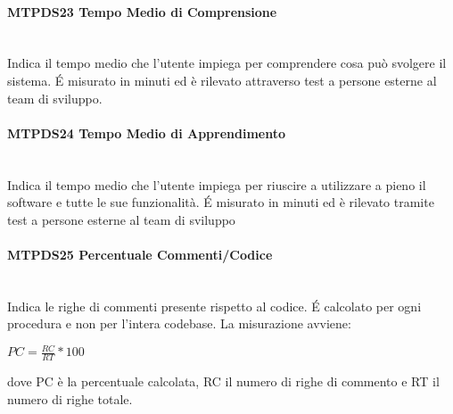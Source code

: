 \paragraph{MTPDS23 Tempo Medio di Comprensione}\-\\
Indica il tempo medio che l'utente impiega per comprendere cosa può svolgere il sistema. \'E misurato in minuti ed è rilevato attraverso test a persone esterne al team di sviluppo.

\paragraph{MTPDS24 Tempo Medio di Apprendimento}\-\\
Indica il tempo medio che l'utente impiega per riuscire a utilizzare a pieno il software e tutte le sue funzionalità. \'E misurato in minuti ed è rilevato tramite test a persone esterne al team di sviluppo 

\paragraph{MTPDS25 Percentuale Commenti/Codice}\-\\
Indica le righe di commenti presente rispetto al codice. \'E calcolato per ogni procedura e non per l'intera codebase. La misurazione avviene:
\begin{center}
	\item $PC = \frac{RC}{RT}*100$
\end{center}
dove PC è la percentuale calcolata, RC il numero di righe di commento e RT il numero di righe totale.


